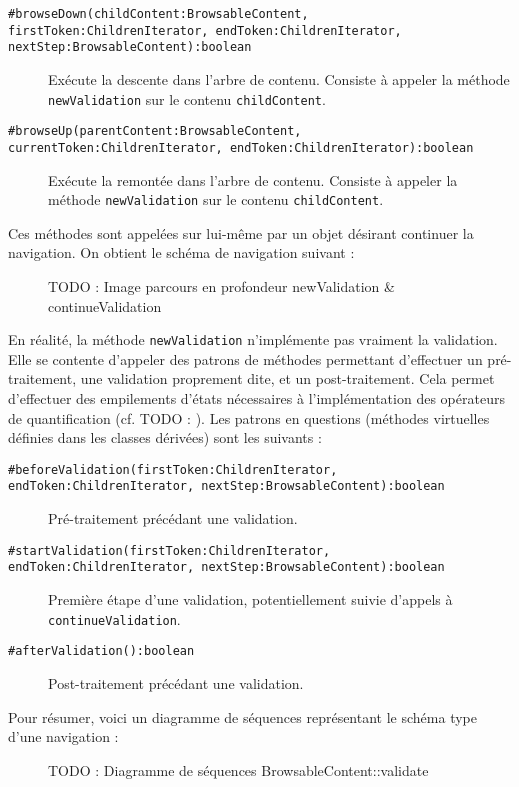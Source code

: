 \documentclass[12pt]{article}
\newcommand{\kw}[1]{\texttt{#1}}
\newcommand{\TODO}[1]{{\huge TODO : #1}}
\begin{document}
\begin{description}
\item[\kw{\#browseDown(childContent:BrowsableContent, firstToken:ChildrenIterator, endToken:ChildrenIterator, nextStep:BrowsableContent):boolean}] Exécute la descente dans l'arbre de contenu. Consiste à appeler la méthode \kw{newValidation} sur le contenu \kw{childContent}.
\item[\kw{\#browseUp(parentContent:BrowsableContent, currentToken:ChildrenIterator, endToken:ChildrenIterator):boolean}] Exécute la remontée dans l'arbre de contenu. Consiste à appeler la méthode \kw{newValidation} sur le contenu \kw{childContent}.
\end{description}
Ces méthodes sont appelées sur lui-même par un objet désirant continuer la navigation.
On obtient le schéma de navigation suivant :
\begin{figure}
\caption{\TODO{Image parcours en profondeur newValidation & continueValidation}}
\end{figure}
En réalité, la méthode \kw{newValidation} n'implémente pas vraiment la validation. Elle se contente d'appeler des patrons de méthodes permettant d'effectuer un pré-traitement, une validation proprement dite, et un post-traitement. Cela permet d'effectuer des empilements d'états nécessaires à l'implémentation des opérateurs de quantification (cf. \TODO{}). Les patrons en questions (méthodes virtuelles définies dans les classes dérivées) sont les suivants :
\begin{description}
\item[\kw{\#beforeValidation(firstToken:ChildrenIterator, endToken:ChildrenIterator, nextStep:BrowsableContent):boolean}] Pré-traitement précédant une validation.
\item[\kw{\#startValidation(firstToken:ChildrenIterator, endToken:ChildrenIterator, nextStep:BrowsableContent):boolean}] Première étape d'une validation, potentiellement suivie d'appels à \kw{continueValidation}.
\item[\kw{\#afterValidation():boolean}] Post-traitement précédant une validation.
\end{description}
Pour résumer, voici un diagramme de séquences représentant le schéma type d'une navigation :
\begin{figure}
\caption{\TODO{Diagramme de séquences BrowsableContent::validate}}
\end{figure}
\end{document}
